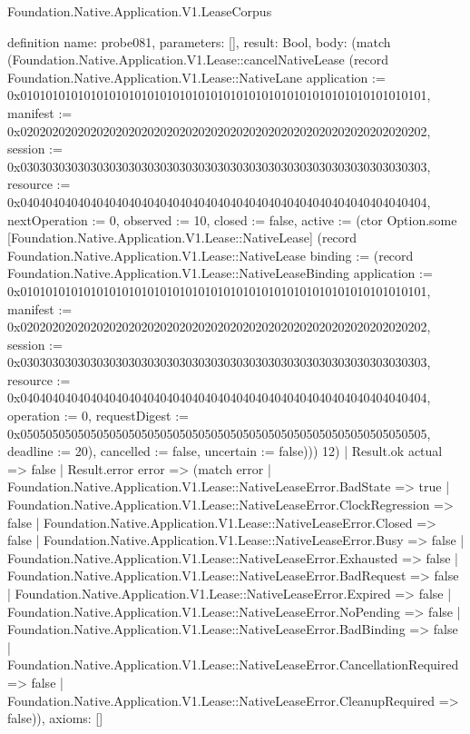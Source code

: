 \begin{lexlean}{Foundation.Native.Application.V1.LeaseCorpus}
\begin{semanticmodule}
definition{
  name: probe081,
  parameters: [],
  result: Bool,
  body: (match (Foundation.Native.Application.V1.Lease::cancelNativeLease (record Foundation.Native.Application.V1.Lease::NativeLane {application := 0x0101010101010101010101010101010101010101010101010101010101010101, manifest := 0x0202020202020202020202020202020202020202020202020202020202020202, session := 0x0303030303030303030303030303030303030303030303030303030303030303, resource := 0x0404040404040404040404040404040404040404040404040404040404040404, nextOperation := 0, observed := 10, closed := false, active := (ctor Option.some [Foundation.Native.Application.V1.Lease::NativeLease] (record Foundation.Native.Application.V1.Lease::NativeLease {binding := (record Foundation.Native.Application.V1.Lease::NativeLeaseBinding {application := 0x0101010101010101010101010101010101010101010101010101010101010101, manifest := 0x0202020202020202020202020202020202020202020202020202020202020202, session := 0x0303030303030303030303030303030303030303030303030303030303030303, resource := 0x0404040404040404040404040404040404040404040404040404040404040404, operation := 0, requestDigest := 0x0505050505050505050505050505050505050505050505050505050505050505, deadline := 20}), cancelled := false, uncertain := false}))}) 12)
    | Result.ok actual => false
    | Result.error error => (match error
      | Foundation.Native.Application.V1.Lease::NativeLeaseError.BadState => true
      | Foundation.Native.Application.V1.Lease::NativeLeaseError.ClockRegression => false
      | Foundation.Native.Application.V1.Lease::NativeLeaseError.Closed => false
      | Foundation.Native.Application.V1.Lease::NativeLeaseError.Busy => false
      | Foundation.Native.Application.V1.Lease::NativeLeaseError.Exhausted => false
      | Foundation.Native.Application.V1.Lease::NativeLeaseError.BadRequest => false
      | Foundation.Native.Application.V1.Lease::NativeLeaseError.Expired => false
      | Foundation.Native.Application.V1.Lease::NativeLeaseError.NoPending => false
      | Foundation.Native.Application.V1.Lease::NativeLeaseError.BadBinding => false
      | Foundation.Native.Application.V1.Lease::NativeLeaseError.CancellationRequired => false
      | Foundation.Native.Application.V1.Lease::NativeLeaseError.CleanupRequired => false)),
  axioms: []
}


\end{semanticmodule}
\end{lexlean}
